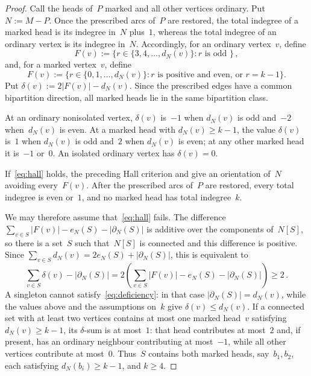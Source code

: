 \documentclass[10pt,a4paper]{amsart}
\begin{document}
\begin{proof}
  Call the heads of~$P$ marked and all other vertices ordinary.
  Put $N := M-P$.
  Once the prescribed arcs of~$P$ are restored, the total indegree of a marked
  head is its indegree in~$N$ plus~$1$, whereas the total indegree of an
  ordinary vertex is its indegree in~$N$.
  Accordingly, for an ordinary vertex~$v$, define
  \[
    F(v) := \{r \in \{3,4,\ldots,d_N(v)\} \colon r \text{ is odd }\} \, ,
  \]
  and, for a marked vertex~$v$, define
  \[
    F(v) := \{r \in \{0,1,\ldots,d_N(v)\} \colon r \text{ is positive and even,
    or } r = k-1\}.
  \]
  Put $\delta(v) := 2|F(v)| - d_N(v)$.
  Since the prescribed edges have a common bipartition direction, all marked
  heads lie in the same bipartition class.

  At an ordinary nonisolated vertex, $\delta(v)$ is~$-1$ when $d_N(v)$ is odd
  and~$-2$ when~$d_N(v)$ is even.
  At a marked head with $d_N(v) \ge k-1$, the value $\delta(v)$ is~$1$ when
  $d_N(v)$ is odd and~$2$ when $d_N(v)$ is even; at any other marked head it
  is~$-1$ or~$0$.
  An isolated ordinary vertex has $\delta(v) = 0$.

  If~\eqref{eq:hall} holds, the preceding Hall criterion and 
  give an orientation of~$N$ avoiding every~$F(v)$.
  After the prescribed arcs of~$P$ are restored, every total indegree is even
  or~$1$, and no marked head has total indegree~$k$.

  We may therefore assume that~\eqref{eq:hall} fails.
  The difference $\sum_{v \in S} |F(v)| - e_N(S) - |\partial_N(S)|$ is additive
  over the components of~$N[S]$, so there is a set~$S$ such that~$N[S]$ is
  connected and this difference is positive. 
  Since $\sum_{v \in S} d_N(v) = 2e_N(S) + |\partial_N(S)|$, this is equivalent
  to
  \begin{equation}\label{eq:deficiency}
    \sum_{v \in S} \delta(v) - |\partial_N(S)|
      = 2 \left(\sum_{v \in S} |F(v)| - e_N(S) - |\partial_N(S)| \right) \ge 2 \, .
  \end{equation}
  A singleton cannot satisfy~\eqref{eq:deficiency}: in that case
  $|\partial_N(S)| = d_N(v)$, while the values above and the assumptions on~$k$
  give $\delta(v) \le d_N(v)$. 
  If a connected set with at least two vertices contains at most one marked
  head~$v$ satisfying $d_N(v) \ge k-1$, its $\delta$-sum is at most~$1$: that
  head contributes at most~$2$ and, if present, has an ordinary neighbour
  contributing at most~$-1$, while all other vertices contribute at most~$0$.
  Thus~$S$ contains both marked heads, say~$b_1,b_2$, each satisfying
  $d_N(b_i) \ge k-1$, and $k \ge 4$.


\end{proof}
\end{document}

